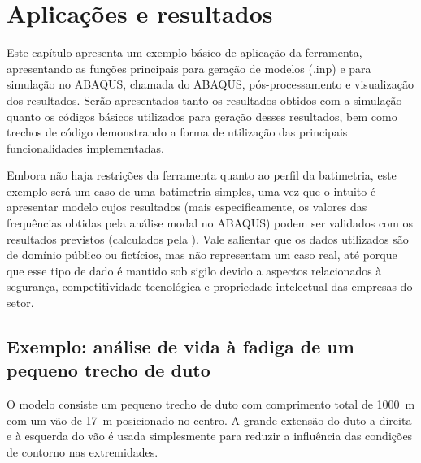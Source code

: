
\chapter{Aplicações e resultados\label{chap:aplicacoes}}

Este capítulo apresenta um exemplo básico de aplicação da ferramenta, apresentando as funções principais para geração de modelos (.inp) e para simulação no ABAQUS, chamada do ABAQUS, pós-processamento e visualização dos resultados. Serão apresentados tanto os resultados obtidos com a simulação quanto os códigos básicos utilizados para geração desses resultados, bem como trechos de código demonstrando a forma de utilização das principais funcionalidades implementadas.

Embora não haja restrições da ferramenta quanto ao perfil da batimetria, este exemplo será um caso de uma batimetria simples, uma vez que o intuito é apresentar modelo cujos resultados (mais especificamente, os valores das frequências obtidas pela análise modal no ABAQUS) podem ser validados com os resultados previstos (calculados pela \fatfree).
Vale salientar que os dados utilizados são de domínio público ou fictícios, mas não representam um caso real, até porque que esse tipo de dado é mantido sob sigilo devido a aspectos relacionados à segurança, competitividade tecnológica e propriedade intelectual das empresas do setor.


\section{Exemplo: análise de vida à fadiga de um pequeno trecho de duto\label{sec:model-exemplo}}


O modelo consiste um pequeno trecho de duto com comprimento total de 1000~m com um vão de 17~m posicionado no centro. A grande extensão do duto a direita e à esquerda do vão é usada simplesmente para reduzir a influência das condições de contorno nas extremidades.

